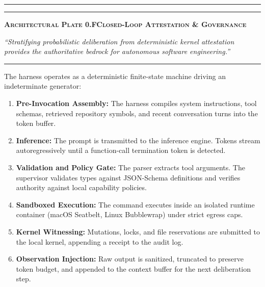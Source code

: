 \vspace{10pt}
\noindent\begin{minipage}{\linewidth}
  \centering
  \par\vspace{8pt}%
  {\color{pdcobalt}\rule{\linewidth}{1.2pt}}\par\vspace{5pt}%
  \raggedright
  {\color{pdswissred}\rule{4.5pt}{4.5pt}}\enspace%
  {\pdgrotesk\bfseries\scshape\fontsize{9}{11}\selectfont\color{hhink}%
    Architectural Plate 0.F\enspace\textperiodcentered\enspace Closed-Loop Attestation \& Governance}\par\vspace{4pt}%
  {\pdgrotesk\itshape\fontsize{9.5}{13}\selectfont\color{hhink}%
    ``Stratifying probabilistic deliberation from deterministic kernel attestation provides the authoritative bedrock for autonomous software engineering.''}\par\vspace{6pt}%
  {\color{hhgray!30}\rule{\linewidth}{0.4pt}}
\end{minipage}
\vspace{10pt}


The harness operates as a deterministic finite-state machine driving an indeterminate generator:
\begin{enumerate}[leftmargin=1.8em,itemsep=2pt]
  \item \textbf{Pre-Invocation Assembly:} The harness compiles system instructions, tool schemas, retrieved repository symbols, and recent conversation turns into the token buffer.
  \item \textbf{Inference:} The prompt is transmitted to the inference engine. Tokens stream autoregressively until a function-call termination token is detected.
  \item \textbf{Validation and Policy Gate:} The parser extracts tool arguments. The supervisor validates types against JSON-Schema definitions and verifies authority against local capability policies.
  \item \textbf{Sandboxed Execution:} The command executes inside an isolated runtime container (macOS Seatbelt, Linux Bubblewrap) under strict egress caps.
  \item \textbf{Kernel Witnessing:} Mutations, locks, and file reservations are submitted to the local kernel, appending a receipt to the audit log.
  \item \textbf{Observation Injection:} Raw output is sanitized, truncated to preserve token budget, and appended to the context buffer for the next deliberation step.
\end{enumerate}

